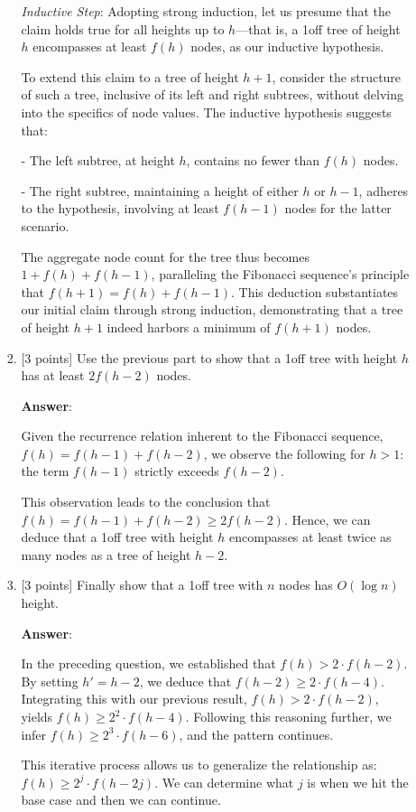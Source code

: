 \documentclass[11pt]{article}
\begin{document}
\begin{enumerate}
\begin{enumerate}
\begin{enumerate}
\emph{Inductive Step}: Adopting strong induction, let us presume that the claim holds true for all heights up to $h$—that is, a 1off tree of height $h$ encompasses at least $f(h)$ nodes, as our inductive hypothesis.

To extend this claim to a tree of height $h+1$, consider the structure of such a tree, inclusive of its left and right subtrees, without delving into the specifics of node values. The inductive hypothesis suggests that:

- The left subtree, at height $h$, contains no fewer than $f(h)$ nodes.

- The right subtree, maintaining a height of either $h$ or $h-1$, adheres to the hypothesis, involving at least $f(h-1)$ nodes for the latter scenario.

The aggregate node count for the tree thus becomes $1 + f(h) + f(h-1)$, paralleling the Fibonacci sequence's principle that $f(h+1) = f(h) + f(h-1)$. This deduction substantiates our initial claim through strong induction, demonstrating that a tree of height $h+1$ indeed harbors a minimum of $f(h+1)$ nodes.

\item {[3 points]} Use the previous part to show that a 1off tree with height $h$ has
  at least $2f(h-2)$ nodes.
  
\textbf{Answer}:

Given the recurrence relation inherent to the Fibonacci sequence, $f(h) = f(h-1) + f(h-2)$, we observe the following for $h > 1$: the term $f(h-1)$ strictly exceeds $f(h-2)$.

This observation leads to the conclusion that $f(h) = f(h-1) + f(h-2) \ge 2f(h-2)$. Hence, we can deduce that a 1off tree with height $h$ encompasses at least twice as many nodes as a tree of height $h-2$.

\item {[3 points]} Finally show that a 1off tree with $n$ nodes has $O(\log n)$ height.

\textbf{Answer}:

In the preceding question, we established that $f(h) > 2 \cdot f(h-2)$. By setting $h' = h - 2$, we deduce that $f(h-2) \geq 2 \cdot f(h-4)$. Integrating this with our previous result, $f(h) > 2 \cdot f(h-2)$, yields $f(h) \geq 2^2 \cdot f(h-4)$. Following this reasoning further, we infer $f(h) \geq 2^3 \cdot f(h-6)$, and the pattern continues.

This iterative process allows us to generalize the relationship as: $f(h) \geq 2^j \cdot f(h - 2j)$. We can determine what $j$ is when we hit the base case and then we can continue.


\end{enumerate}
\end{enumerate}
\end{enumerate}
\end{document}
